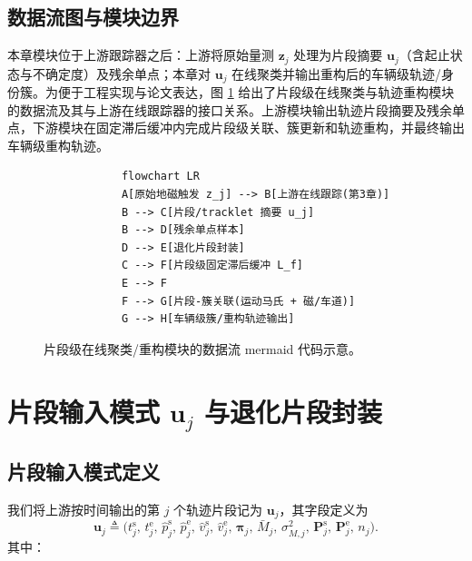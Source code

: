 \documentclass{xdupgthesis}
\begin{document}
\subsection{数据流图与模块边界}
本章模块位于上游跟踪器之后：上游将原始量测 $\mathbf{z}_j$ 处理为片段摘要 $\mathbf{u}_j$（含起止状态与不确定度）及残余单点；本章对 $\mathbf{u}_j$ 在线聚类并输出重构后的车辆级轨迹/身份簇。为便于工程实现与论文表达，图 \ref{fig:mermaid_flow_frag} 给出了片段级在线聚类与轨迹重构模块的数据流及其与上游在线跟踪器的接口关系。上游模块输出轨迹片段摘要及残余单点，下游模块在固定滞后缓冲内完成片段级关联、簇更新和轨迹重构，并最终输出车辆级重构轨迹。

\begin{figure}[htbp]
	\centering
	\begin{minipage}{0.92\linewidth}
		\begin{verbatim}
			flowchart LR
			A[原始地磁触发 z_j] --> B[上游在线跟踪(第3章)]
			B --> C[片段/tracklet 摘要 u_j]
			B --> D[残余单点样本]
			D --> E[退化片段封装]
			C --> F[片段级固定滞后缓冲 L_f]
			E --> F
			F --> G[片段-簇关联(运动马氏 + 磁/车道)]
			G --> H[车辆级簇/重构轨迹输出]
		\end{verbatim}
	\end{minipage}
	\caption{片段级在线聚类/重构模块的数据流 mermaid 代码示意。}
	\label{fig:mermaid_flow_frag}
\end{figure}

\section{片段输入模式 $\mathbf{u}_j$ 与退化片段封装}
\subsection{片段输入模式定义}
我们将上游按时间输出的第 $j$ 个轨迹片段记为 $\mathbf{u}_j$，其字段定义为
\begin{equation}
	\mathbf{u}_j \triangleq
	\Big(
	t_j^{\mathrm{s}},\, t_j^{\mathrm{e}},\,
	\hat p_j^{\mathrm{s}},\, \hat p_j^{\mathrm{e}},\,
	\hat v_j^{\mathrm{s}},\, \hat v_j^{\mathrm{e}},\,
	\boldsymbol{\pi}_j,\,
	\bar M_j,\, \sigma_{M,j}^2,\,
	\mathbf{P}_j^{\mathrm{s}},\, \mathbf{P}_j^{\mathrm{e}},\,
	n_j
	\Big).
	\tag{4-1}
\end{equation}
其中：
\end{document}

